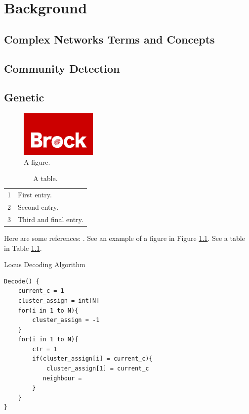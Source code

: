 \chapter{Background}
\label{system}
\section{Complex Networks Terms and Concepts}

\section{Community Detection}

\section{Genetic}

\begin{figure}[!htb]
\begin{center}
\includegraphics[scale=1.0]{Brock_Logo.png}
\end{center}
\caption{A figure.}
\label{logo}
\end{figure}



\begin{table}[h]
\caption{A table.}
\label{tabledata}
\begin{tabular}{rl}
1 & First entry.\\
2 & Second entry.\\
3 & Third and final entry.
\end{tabular}
\end{table}
Here are some references: \cite{CateniCollaVannucci:, ChiHyuckLeeParkLee:, GoldbergDE:}.
See an example of a figure in Figure \ref{logo}.
See a table in Table \ref{tabledata}.

\begin{table}[b]
\caption{Locus Decoding Algorithm}
\label{algorithmX}
\begin{verbatim}
Decode() {
    current_c = 1
    cluster_assign = int[N]
    for(i in 1 to N){
        cluster_assign = -1
    }
    for(i in 1 to N){
        ctr = 1
        if(cluster_assign[i] = current_c){
            cluster_assign[1] = current_c
           neighbour =
        }
    }
}
\end{verbatim}
\end{table}

